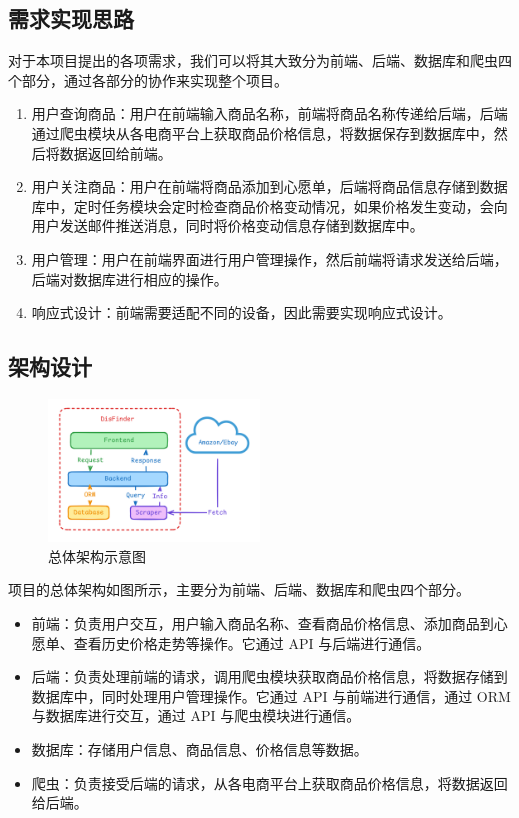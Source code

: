 \subsection{需求实现思路}

对于本项目提出的各项需求，我们可以将其大致分为前端、后端、数据库和爬虫四个部分，通过各部分的协作来实现整个项目。

\begin{enumerate}
  \item 用户查询商品：用户在前端输入商品名称，前端将商品名称传递给后端，后端通过爬虫模块从各电商平台上获取商品价格信息，将数据保存到数据库中，然后将数据返回给前端。
  \item 用户关注商品：用户在前端将商品添加到心愿单，后端将商品信息存储到数据库中，定时任务模块会定时检查商品价格变动情况，如果价格发生变动，会向用户发送邮件推送消息，同时将价格变动信息存储到数据库中。
  \item 用户管理：用户在前端界面进行用户管理操作，然后前端将请求发送给后端，后端对数据库进行相应的操作。
  \item 响应式设计：前端需要适配不同的设备，因此需要实现响应式设计。
\end{enumerate}

\subsection{架构设计}

\begin{figure}[H]
\centering
\includegraphics[width=0.5\textwidth]{assets/report/architecture.png}
\caption{总体架构示意图}
\end{figure}

项目的总体架构如图所示，主要分为前端、后端、数据库和爬虫四个部分。

\begin{itemize}
  \item 前端：负责用户交互，用户输入商品名称、查看商品价格信息、添加商品到心愿单、查看历史价格走势等操作。它通过 API 与后端进行通信。
  \item 后端：负责处理前端的请求，调用爬虫模块获取商品价格信息，将数据存储到数据库中，同时处理用户管理操作。它通过 API 与前端进行通信，通过 ORM 与数据库进行交互，通过 API 与爬虫模块进行通信。
  \item 数据库：存储用户信息、商品信息、价格信息等数据。
  \item 爬虫：负责接受后端的请求，从各电商平台上获取商品价格信息，将数据返回给后端。
\end{itemize}

